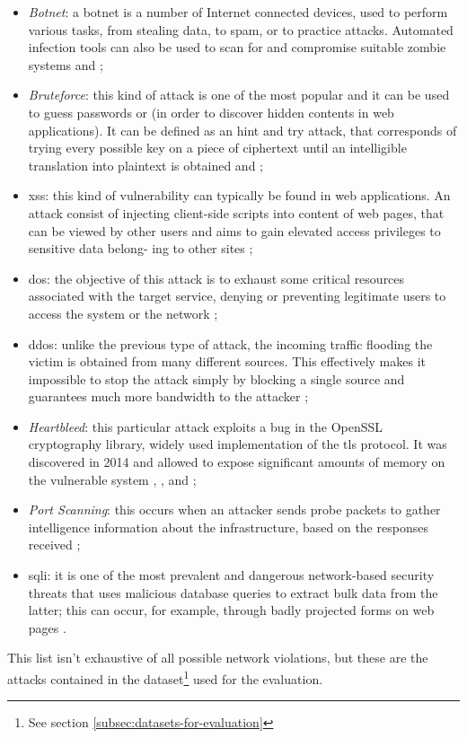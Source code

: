 \begin{itemize}
    \item[\faCaretRight] \textit{Botnet}: a botnet is a number of Internet connected devices, used to perform various tasks, from stealing data, to spam, or to practice  attacks. Automated infection tools can also be used to scan for and compromise suitable zombie systems \cite{icissp18} and \cite[p.~250]{Sharafaldin2019};
    \item[\faCaretRight] \textit{Bruteforce}: this kind of attack is one of the most popular and it can be used to guess passwords or  (in order to discover hidden contents in web applications). It can be defined as an hint and try attack, that corresponds of trying every possible key on a piece of ciphertext until an intelligible translation into plaintext is obtained \cite{icissp18} and \cite[p.~43]{Sharafaldin2019};
    \item[\faCaretRight] \gls{xss}: this kind of vulnerability can typically be found in web applications. An  attack consist of injecting client-side scripts into  content of web pages, that can be viewed by other users and aims to gain elevated access privileges to sensitive data belong- ing to other sites \cite[p.~387]{Sharafaldin2019};
    \item[\faCaretRight] \gls{dos}: the objective of this attack is to exhaust some critical resources associated with the target service, denying or preventing legitimate users to access the system or the network \cite[p.~241]{Sharafaldin2019};
    \item[\faCaretRight] \gls{ddos}: unlike the previous type of attack, the incoming traffic flooding the victim is obtained from many different sources. This effectively makes it impossible to stop the attack simply by blocking a single source and guarantees much more bandwidth to the attacker \cite[p.~241]{Sharafaldin2019};
    \item[\faCaretRight] \textit{Heartbleed}: this particular attack exploits a bug in the OpenSSL cryptography library, widely used implementation of the \gls{tls} protocol. It was discovered in 2014 and allowed to expose significant amounts of memory on the vulnerable system \cite{Carvalho2014}, \cite{icissp18}, \cite{Stallings2014} and \cite[p.~706]{Sharafaldin2019};
    \item[\faCaretRight] \textit{Port Scanning}: this occurs when an attacker sends probe packets to gather intelligence information about the infrastructure, based on the responses received \cite{icissp18};
    \item[\faCaretRight] \gls{sqli}: it is one of the most prevalent and dangerous network-based security threats that uses malicious database queries to extract bulk data from the latter; this can occur, for example, through badly projected forms on web pages \cite[p.~163]{Sharafaldin2019}.
\end{itemize}
This list isn't exhaustive of all possible network violations, but these are the attacks contained in the dataset\footnote{See section \ref{subsec:datasets-for-evaluation}} used for the evaluation.

